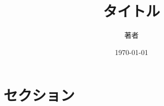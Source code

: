 \documentclass[dvipdfmx, 12pt]{jarticle}
\title{タイトル}
\author{著者}
\date{\today}
\begin{document}
\maketitle
\section{セクション}
\end{document}
